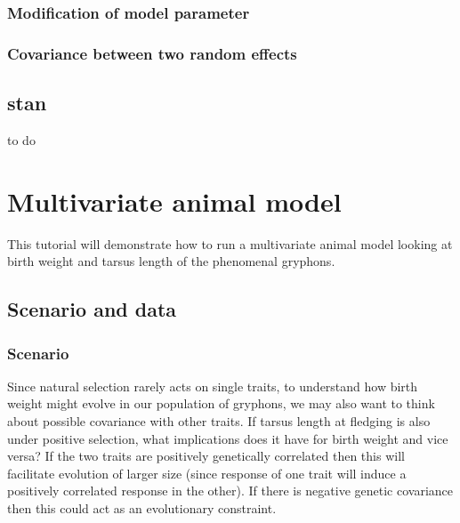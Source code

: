 \documentclass[
  12pt,
]{book}
\begin{document}
\hypertarget{modification-of-model-parameter-2}{%
\subsection{Modification of model parameter}\label{modification-of-model-parameter-2}}

\hypertarget{covariance-between-two-random-effects-2}{%
\subsection{Covariance between two random effects}\label{covariance-between-two-random-effects-2}}

\hypertarget{stan}{%
\section{stan}\label{stan}}

to do

\hypertarget{multivariate-animal-model}{%
\chapter{Multivariate animal model}\label{multivariate-animal-model}}

This tutorial will demonstrate how to run a multivariate animal model looking at birth weight and tarsus length of the phenomenal gryphons.

\hypertarget{scenario-and-data-1}{%
\section{Scenario and data}\label{scenario-and-data-1}}

\hypertarget{scenario-1}{%
\subsection{Scenario}\label{scenario-1}}

Since natural selection rarely acts on single traits, to understand how birth weight might evolve in our population of gryphons, we may also want to think about possible covariance with other traits. If tarsus length at fledging is also under positive selection, what implications does it have for birth weight and vice versa? If the two traits are positively genetically correlated then this will facilitate evolution of larger size (since response of one trait will induce a positively correlated response in the other). If there is negative genetic covariance then this could act as an evolutionary constraint.
\end{document}
